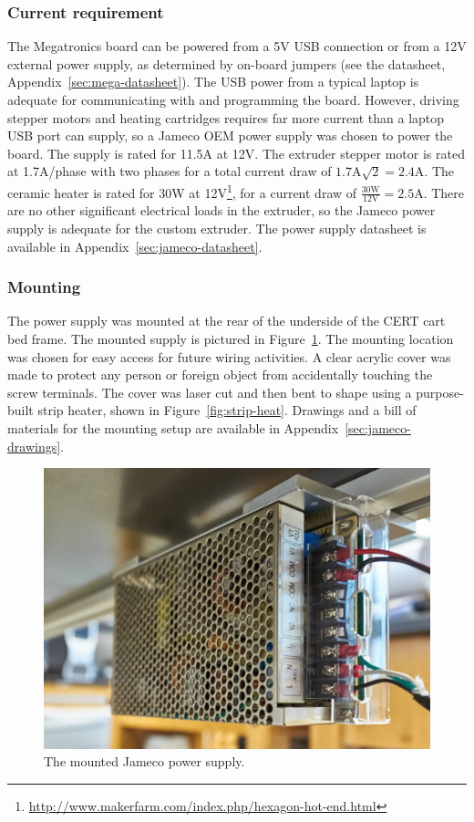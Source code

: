 \subsubsection{Current requirement}
The Megatronics board can be powered from a 5V USB connection or from a 12V external power supply, as determined by on-board jumpers (see the datasheet, Appendix~\ref{sec:mega-datasheet}). The USB power from a typical laptop is adequate for communicating with and programming the board. However, driving stepper motors and heating cartridges requires far more current than a laptop USB port can supply, so a Jameco OEM power supply was chosen to power the board. The supply is rated for 11.5A at 12V. The extruder stepper motor is rated at 1.7A/phase with two phases for a total current draw of \(1.7\si{\ampere}\sqrt{2}=2.4\si{\ampere}\). The ceramic heater is rated for 30W at 12V\footnote{\url{http://www.makerfarm.com/index.php/hexagon-hot-end.html}}, for a current draw of \(\frac{30\si{\watt}}{12\si{\volt}}=2.5\si{\ampere}\). There are no other significant electrical loads in the extruder, so the Jameco power supply is adequate for the custom extruder. The power supply datasheet is available in Appendix~\ref{sec:jameco-datasheet}.

\subsubsection{Mounting}
The power supply was mounted at the rear of the underside of the CERT cart bed frame. The mounted supply is pictured in Figure~\ref{fig:jameco-mounted}. The mounting location was chosen for easy access for future wiring activities. A clear acrylic cover was made to protect any person or foreign object from accidentally touching the screw terminals. The cover was laser cut and then bent to shape using a purpose-built strip heater, shown in Figure~\ref{fig:strip-heat}. Drawings and a bill of materials for the mounting setup are available in Appendix~\ref{sec:jameco-drawings}.

\begin{figure}
    \centering
    \includegraphics[width=.8\linewidth]{figures/jameco-mounted}
    \caption{The mounted Jameco power supply.}
    \label{fig:jameco-mounted}
\end{figure}

